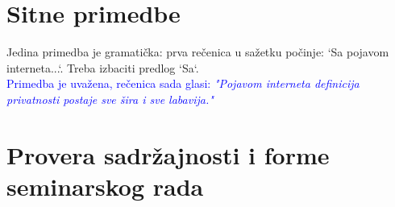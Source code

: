 \documentclass[a4paper]{report}
\newcommand{\odgovor}[1]{\textcolor{blue}{#1}}
\begin{document}
\section{Sitne primedbe}
Jedina primedba je gramatička: prva rečenica u sažetku počinje: `Sa pojavom interneta...`. Treba izbaciti predlog `Sa`. \\
\odgovor{Primedba je uvažena, rečenica sada glasi: \emph{"Pojavom interneta definicija privatnosti postaje sve šira i sve labavija."}}

\section{Provera sadržajnosti i forme seminarskog rada}
\end{document}
